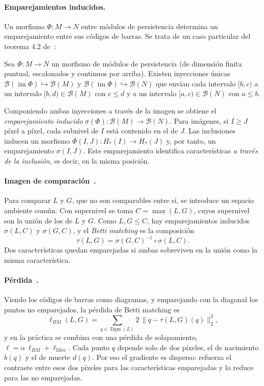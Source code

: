 \paragraph{Emparejamientos inducidos.} Un morfismo $\Phi:M\to N$ entre
módulos de persistencia determina un emparejamiento entre sus códigos de
barras. Se trata de un caso particular del teorema 4.2 de~\cite{bauer2015}:

\begin{teorema}
Sea $\Phi:M\to N$ un morfismo de módulos de persistencia (de dimensión
finita puntual, escalonados y continuos por arriba). Existen inyecciones
únicas $\mathcal{B}(\operatorname{im}\Phi)\hookrightarrow\mathcal{B}(M)$ y
$\mathcal{B}(\operatorname{im}\Phi)\hookrightarrow\mathcal{B}(N)$ que envían
cada intervalo $[b,c)$ a un intervalo $[b,d)\in\mathcal{B}(M)$ con $c\le d$
y a un intervalo $[a,c)\in\mathcal{B}(N)$ con $a\le b$.
\end{teorema}

Componiendo ambas inyecciones a través de la imagen se obtiene el
\emph{emparejamiento inducido} $\sigma(\Phi):\mathcal{B}(M)\to\mathcal{B}(N)$.
Para imágenes, si $I\ge J$ píxel a píxel, cada subnivel de $I$ está
contenido en el de $J$. Las inclusiones inducen un morfismo
$\Phi(I,J):H_*(I)\to H_*(J)$ y, por tanto, un emparejamiento
$\sigma(I,J)$. Este emparejamiento identifica características
\emph{a través de la inclusión}, es decir, en la misma posición.

\paragraph{Imagen de comparación~\cite[§3.1]{stucki2023}.} Para comparar $L$ y $G$, que no son
comparables entre sí, se introduce un espacio ambiente común. Con
supernivel se toma $C=\max(L,G)$, cuyos supernivel son la unión de los de
$L$ y $G$. Como $L,G\le C$, hay emparejamientos inducidos $\sigma(L,C)$ y
$\sigma(G,C)$, y el \emph{Betti matching} es la composición
\[
  \tau(L,G)=\sigma(G,C)^{-1}\circ\sigma(L,C).
\]
Dos características quedan emparejadas si ambas sobreviven en la unión como
la misma característica.

\paragraph{Pérdida~\cite[§3.2]{stucki2023}.} Viendo los códigos de barras como diagramas, y
emparejando con la diagonal los puntos no emparejados, la pérdida de Betti
matching es
\[
  \ell_{BM}(L,G)=\sum_{q\in\operatorname{Dgm}(L)}2\,\|q-\tau(L,G)(q)\|_2^2,
\]
y en la práctica se combina con una pérdida de solapamiento,
$\ell=\alpha\,\ell_{BM}+\ell_{\mathrm{Dice}}$. Cada punto $q$ depende
solo de dos píxeles, el de nacimiento $b(q)$ y el de muerte $d(q)$. Por
eso el gradiente es disperso: refuerza el contraste entre esos dos píxeles
para las características emparejadas y lo reduce para las no emparejadas.

